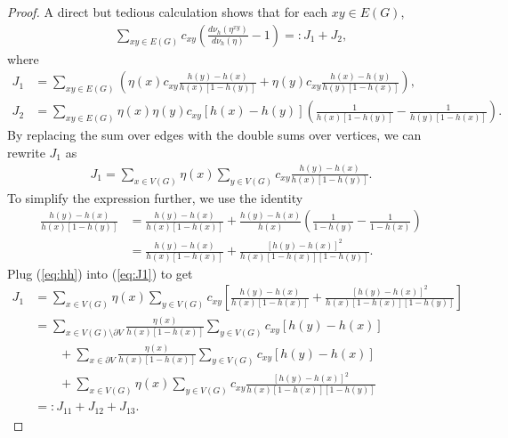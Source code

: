 \documentclass[11pt]{amsart}
\theoremstyle{plain}
\theoremstyle{definition}
\theoremstyle{remark}
\begin{document}
\begin{proof}
A direct but tedious calculation shows that for each $xy\in E(G)$,
\begin{align*}
\sum_{xy\in E(G)} c_{xy}\left(\frac{d\nu_h(\eta^{xy})}{d\nu_h(\eta)}-1\right) =: J_1 + J_2,
\end{align*}
where
\begin{align*}
J_1 &= \sum_{xy\in E(G)} \left(\eta(x) c_{xy} \frac{h(y)-h(x)}{h(x)[1-h(y)]} + \eta(y) c_{xy} \frac{h(x)-h(y)}{h(y)[1-h(x)]}\right),\\
J_2 &= \sum_{xy\in E(G)} \eta(x) \eta(y) c_{xy} \left[h(x)-h(y)\right]\left(\frac{1}{h(x)[1-h(y)]} - \frac{1}{h(y)[1-h(x)]}\right).
\end{align*}
By replacing the sum over edges with the double sums over vertices, we can rewrite $J_1$ as
\begin{align}
\label{eq:J1}
J_1 = \sum_{x\in V(G)} \eta(x) \sum_{y\in V(G)} c_{xy} \frac{h(y)-h(x)}{h(x)[1-h(y)]}.
\end{align}
To simplify the expression further, we use the identity
\begin{align}
\label{eq:hh}
\frac{h(y)-h(x)}{h(x)[1-h(y)]} &= \frac{h(y)-h(x)}{h(x)[1-h(x)]} + \frac{h(y)-h(x)}{h(x)}\left(\frac{1}{1-h(y)}- \frac{1}{1-h(x)}\right)\\
\nonumber &= \frac{h(y)-h(x)}{h(x)[1-h(x)]} +  \frac{[h(y)-h(x)]^2}{h(x)[1-h(x)][1-h(y)]}.
\end{align}
Plug (\ref{eq:hh}) into (\ref{eq:J1}) to get
\begin{align}
\label{J1breakdown}
J_1 &= \sum_{x\in V(G)} \eta(x) \sum_{y\in V(G)} c_{xy} \left[ \frac{h(y)-h(x)}{h(x)[1-h(x)]} + \frac{[h(y)-h(x)]^2}{h(x)[1-h(x)][1-h(y)]}\right] \\
\nonumber &=\sum_{x\in V(G)\setminus\partial V} \frac{\eta(x)}{h(x)[1-h(x)]} \sum_{y\in V(G)} c_{xy} [h(y)-h(x)] \\
& \nonumber \qquad + \sum_{x\in \partial V} \frac{\eta(x)}{h(x)[1-h(x)]} \sum_{y\in V(G)} c_{xy}[h(y)-h(x)] \\
& \nonumber \qquad + \sum_{x\in V(G)} \eta(x) \sum_{y\in V(G)} c_{xy} \frac{[h(y)-h(x)]^2}{h(x)[1-h(x)][1-h(y)]}\\
\nonumber &=: J_{11} + J_{12}+ J_{13}.
\end{align}


\end{proof}
\end{document}
